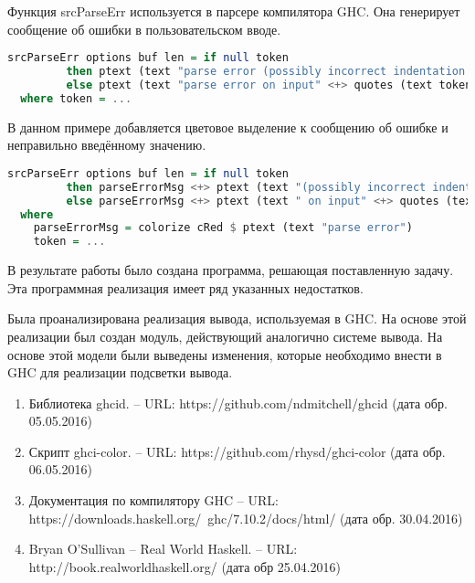 Функция srcParseErr используется в парсере компилятора GHC. Она генерирует сообщение об ошибки в пользовательском вводе.

\begin{lstlisting}[language=Haskell]
srcParseErr options buf len = if null token
         then ptext (text "parse error (possibly incorrect indentation or mismatched brackets)")
         else ptext (text "parse error on input" <+> quotes (text token))
  where token = ...    
\end{lstlisting}

В данном примере добавляется цветовое выделение к сообщению об ошибке и неправильно введённому значению.

\begin{lstlisting}[language=Haskell]
srcParseErr options buf len = if null token
         then parseErrorMsg <+> ptext (text "(possibly incorrect indentation or mismatched brackets)")
         else parseErrorMsg <+> ptext (text " on input" <+> quotes (text token))
  where 
    parseErrorMsg = colorize cRed $ ptext (text "parse error")
    token = ...    
\end{lstlisting}

\Conc
В результате работы было создана программа, решающая поставленную задачу. Эта программная реализация имеет ряд указанных недостатков.

Была проанализирована реализация вывода, используемая в GHC. На основе этой реализации был создан модуль, действующий аналогично системе вывода. На основе этой модели были выведены изменения, которые необходимо внести в GHC для реализации подсветки вывода.

\begin{enumerate}
  \item Библиотека ghcid. -- URL: https://github.com/ndmitchell/ghcid (дата обр. 05.05.2016)
  \item Скрипт ghci-color. -- URL: https://github.com/rhysd/ghci-color (дата обр. 06.05.2016)
  \item Документация по компилятору GHC -- URL: https://downloads.haskell.org/~ghc/7.10.2/docs/html/ (дата обр. 30.04.2016)
  \item Bryan O'Sullivan -- Real World Haskell. -- URL: http://book.realworldhaskell.org/ (дата обр 25.04.2016)
\end{enumerate}

